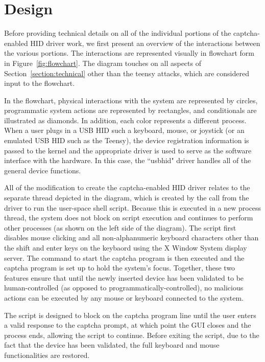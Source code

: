 \documentclass[pagenumbers]{ieee}
\begin{document}
\section{Design}
\label{section:design}

Before providing technical details on all of the individual portions of the captcha-enabled HID driver work, we first present an overview of the interactions between the various portions. The interactions are represented visually in flowchart form in Figure~\ref{fig:flowchart}. The diagram touches on all aspects of Section~\ref{section:technical} other than the teensy attacks, which are considered input to the flowchart.

In the flowchart, physical interactions with the system are represented by circles, programmatic system actions are represented by rectangles, and conditionals are illustrated as diamonds. In addition, each color represents a different process. When a user plugs in a USB HID such a keyboard, mouse, or joystick (or an emulated USB HID such as the Teensy), the device registration information is passed to the kernel and the appropriate driver is used to serve as the software interface with the hardware. In this case, the ``usbhid" driver handles all of the general device functions. 

All of the modification to create the captcha-enabled HID driver relates to the separate thread depicted in the diagram, which is created by the call from the driver to run the user-space shell script. Because this is executed in a new process thread, the system does not block on script execution and continues to perform other processes (as shown on the left side of the diagram). The script first disables mouse clicking and all non-alphanumeric keyboard characters other than the shift and enter keys on the keybaord using the X Window System display server. The command to start the captcha program is then executed and the captcha program is set up to hold the system's focus. Together, these two features ensure that until the newly inserted device has been validated to be human-controlled (as opposed to programmatically-controlled), no malicious actions can be executed by any mouse or keyboard connected to the system. 

The script is designed to block on the captcha program line until the user enters a valid response to the captcha prompt, at which point the GUI closes and the process ends, allowing the script to continue. Before exiting the script, due to the fact that the device has been validated, the full keyboard and mouse functionalities are restored.
\end{document}
